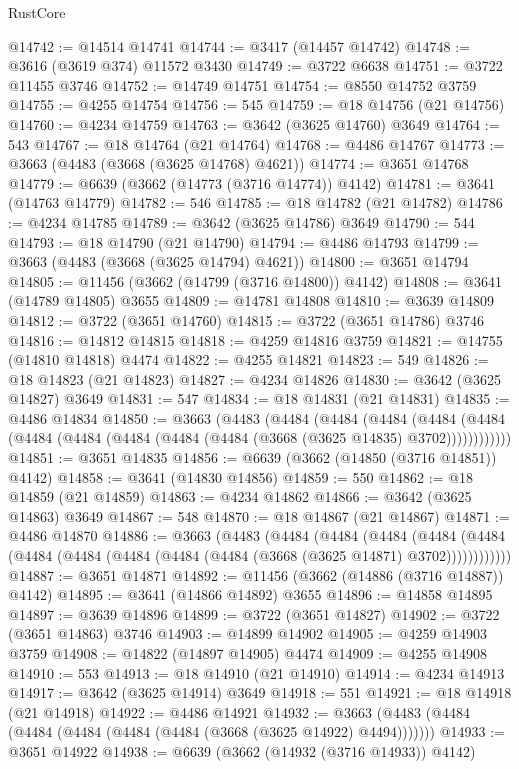 \begin{lexlean}{RustCore}
\begin{coremodule}
@14742 := @14514 @14741
@14744 := @3417 (@14457 @14742)
@14748 := @3616 (@3619 @374) @11572 @3430
@14749 := @3722 @6638
@14751 := @3722 @11455 @3746
@14752 := @14749 @14751
@14754 := @8550 @14752 @3759
@14755 := @4255 @14754
@14756 := 545
@14759 := @18 @14756 (@21 @14756)
@14760 := @4234 @14759
@14763 := @3642 (@3625 @14760) @3649
@14764 := 543
@14767 := @18 @14764 (@21 @14764)
@14768 := @4486 @14767
@14773 := @3663 (@4483 (@3668 (@3625 @14768) @4621))
@14774 := @3651 @14768
@14779 := @6639 (@3662 (@14773 (@3716 @14774)) @4142)
@14781 := @3641 (@14763 @14779)
@14782 := 546
@14785 := @18 @14782 (@21 @14782)
@14786 := @4234 @14785
@14789 := @3642 (@3625 @14786) @3649
@14790 := 544
@14793 := @18 @14790 (@21 @14790)
@14794 := @4486 @14793
@14799 := @3663 (@4483 (@3668 (@3625 @14794) @4621))
@14800 := @3651 @14794
@14805 := @11456 (@3662 (@14799 (@3716 @14800)) @4142)
@14808 := @3641 (@14789 @14805) @3655
@14809 := @14781 @14808
@14810 := @3639 @14809
@14812 := @3722 (@3651 @14760)
@14815 := @3722 (@3651 @14786) @3746
@14816 := @14812 @14815
@14818 := @4259 @14816 @3759
@14821 := @14755 (@14810 @14818) @4474
@14822 := @4255 @14821
@14823 := 549
@14826 := @18 @14823 (@21 @14823)
@14827 := @4234 @14826
@14830 := @3642 (@3625 @14827) @3649
@14831 := 547
@14834 := @18 @14831 (@21 @14831)
@14835 := @4486 @14834
@14850 := @3663
    (@4483
      (@4484
        (@4484
          (@4484
            (@4484 (@4484 (@4484 (@4484 (@4484 (@4484 (@4484 (@3668 (@3625 @14835) @3702))))))))))))
@14851 := @3651 @14835
@14856 := @6639 (@3662 (@14850 (@3716 @14851)) @4142)
@14858 := @3641 (@14830 @14856)
@14859 := 550
@14862 := @18 @14859 (@21 @14859)
@14863 := @4234 @14862
@14866 := @3642 (@3625 @14863) @3649
@14867 := 548
@14870 := @18 @14867 (@21 @14867)
@14871 := @4486 @14870
@14886 := @3663
    (@4483
      (@4484
        (@4484
          (@4484
            (@4484 (@4484 (@4484 (@4484 (@4484 (@4484 (@4484 (@3668 (@3625 @14871) @3702))))))))))))
@14887 := @3651 @14871
@14892 := @11456 (@3662 (@14886 (@3716 @14887)) @4142)
@14895 := @3641 (@14866 @14892) @3655
@14896 := @14858 @14895
@14897 := @3639 @14896
@14899 := @3722 (@3651 @14827)
@14902 := @3722 (@3651 @14863) @3746
@14903 := @14899 @14902
@14905 := @4259 @14903 @3759
@14908 := @14822 (@14897 @14905) @4474
@14909 := @4255 @14908
@14910 := 553
@14913 := @18 @14910 (@21 @14910)
@14914 := @4234 @14913
@14917 := @3642 (@3625 @14914) @3649
@14918 := 551
@14921 := @18 @14918 (@21 @14918)
@14922 := @4486 @14921
@14932 := @3663 (@4483 (@4484 (@4484 (@4484 (@4484 (@4484 (@3668 (@3625 @14922) @4494)))))))
@14933 := @3651 @14922
@14938 := @6639 (@3662 (@14932 (@3716 @14933)) @4142)

\end{coremodule}
\end{lexlean}

